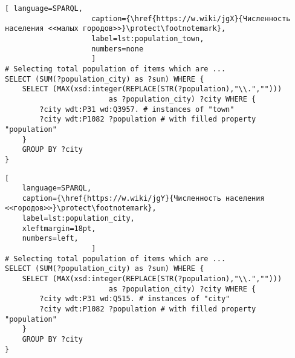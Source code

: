 \newpage
{}
\begin{lstlisting}[ language=SPARQL, 
                    caption={\href{https://w.wiki/jgX}{Численность населения <<малых городов>>}\protect\footnotemark},
                    label=lst:population_town,
                    numbers=none
                    ]
# Selecting total population of items which are ...
SELECT (SUM(?population_city) as ?sum) WHERE {                    
	SELECT (MAX(xsd:integer(REPLACE(STR(?population),"\\.",""))) 
						as ?population_city) ?city WHERE {
		?city wdt:P31 wd:Q3957.	# instances of "town"
		?city wdt:P1082 ?population # with filled property "population"                                  
	}
	GROUP BY ?city
}
\end{lstlisting}


\vspace{-2pt}
\begin{lstlisting}[ 
    language=SPARQL, 
    caption={\href{https://w.wiki/jgY}{Численность населения <<городов>>}\protect\footnotemark},
    label=lst:population_city,
    xleftmargin=18pt, 
    numbers=left,
                    ]
# Selecting total population of items which are ...
SELECT (SUM(?population_city) as ?sum) WHERE {                    
	SELECT (MAX(xsd:integer(REPLACE(STR(?population),"\\.",""))) 
						as ?population_city) ?city WHERE {
		?city wdt:P31 wd:Q515. # instances of "city"
		?city wdt:P1082 ?population # with filled property "population"
	}
	GROUP BY ?city
}\end{lstlisting}


